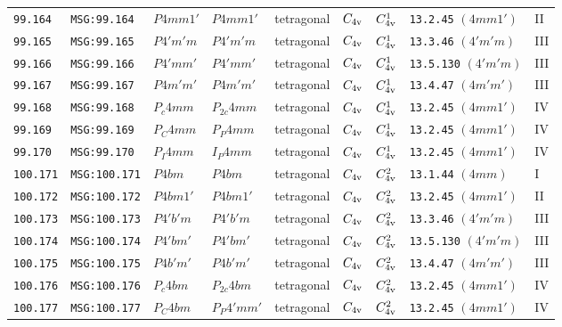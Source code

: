 \documentclass[fleqn,10pt]{jsarticle}
\begin{document}
\begin{center}
\begin{longtable}{lllllllll}
\texttt{99.164} & \texttt{MSG:99.164} & $P4mm1'$ & $P4mm1'$ & tetragonal & $C_{\rm 4v}$ & $C_{\rm 4v}^{1}$ & \texttt{13.2.45} $(4mm1')$ & II \\
\texttt{99.165} & \texttt{MSG:99.165} & $P4'm'm$ & $P4'm'm$ & tetragonal & $C_{\rm 4v}$ & $C_{\rm 4v}^{1}$ & \texttt{13.3.46} $(4'm'm)$ & III \\
\texttt{99.166} & \texttt{MSG:99.166} & $P4'mm'$ & $P4'mm'$ & tetragonal & $C_{\rm 4v}$ & $C_{\rm 4v}^{1}$ & \texttt{13.5.130} $(4'm'm)$ & III \\
\texttt{99.167} & \texttt{MSG:99.167} & $P4m'm'$ & $P4m'm'$ & tetragonal & $C_{\rm 4v}$ & $C_{\rm 4v}^{1}$ & \texttt{13.4.47} $(4m'm')$ & III \\
\texttt{99.168} & \texttt{MSG:99.168} & $P_{c}4mm$ & $P_{2c}4mm$ & tetragonal & $C_{\rm 4v}$ & $C_{\rm 4v}^{1}$ & \texttt{13.2.45} $(4mm1')$ & IV \\
\texttt{99.169} & \texttt{MSG:99.169} & $P_{C}4mm$ & $P_{P}4mm$ & tetragonal & $C_{\rm 4v}$ & $C_{\rm 4v}^{1}$ & \texttt{13.2.45} $(4mm1')$ & IV \\
\texttt{99.170} & \texttt{MSG:99.170} & $P_{I}4mm$ & $I_{P}4mm$ & tetragonal & $C_{\rm 4v}$ & $C_{\rm 4v}^{1}$ & \texttt{13.2.45} $(4mm1')$ & IV \\ \hline
\texttt{100.171} & \texttt{MSG:100.171} & $P4bm$ & $P4bm$ & tetragonal & $C_{\rm 4v}$ & $C_{\rm 4v}^{2}$ & \texttt{13.1.44} $(4mm)$ & I \\
\texttt{100.172} & \texttt{MSG:100.172} & $P4bm1'$ & $P4bm1'$ & tetragonal & $C_{\rm 4v}$ & $C_{\rm 4v}^{2}$ & \texttt{13.2.45} $(4mm1')$ & II \\
\texttt{100.173} & \texttt{MSG:100.173} & $P4'b'm$ & $P4'b'm$ & tetragonal & $C_{\rm 4v}$ & $C_{\rm 4v}^{2}$ & \texttt{13.3.46} $(4'm'm)$ & III \\
\texttt{100.174} & \texttt{MSG:100.174} & $P4'bm'$ & $P4'bm'$ & tetragonal & $C_{\rm 4v}$ & $C_{\rm 4v}^{2}$ & \texttt{13.5.130} $(4'm'm)$ & III \\
\texttt{100.175} & \texttt{MSG:100.175} & $P4b'm'$ & $P4b'm'$ & tetragonal & $C_{\rm 4v}$ & $C_{\rm 4v}^{2}$ & \texttt{13.4.47} $(4m'm')$ & III \\
\texttt{100.176} & \texttt{MSG:100.176} & $P_{c}4bm$ & $P_{2c}4bm$ & tetragonal & $C_{\rm 4v}$ & $C_{\rm 4v}^{2}$ & \texttt{13.2.45} $(4mm1')$ & IV \\
\texttt{100.177} & \texttt{MSG:100.177} & $P_{C}4bm$ & $P_{P}4'mm'$ & tetragonal & $C_{\rm 4v}$ & $C_{\rm 4v}^{2}$ & \texttt{13.2.45} $(4mm1')$ & IV \\

\end{longtable}
\end{center}
\end{document}
